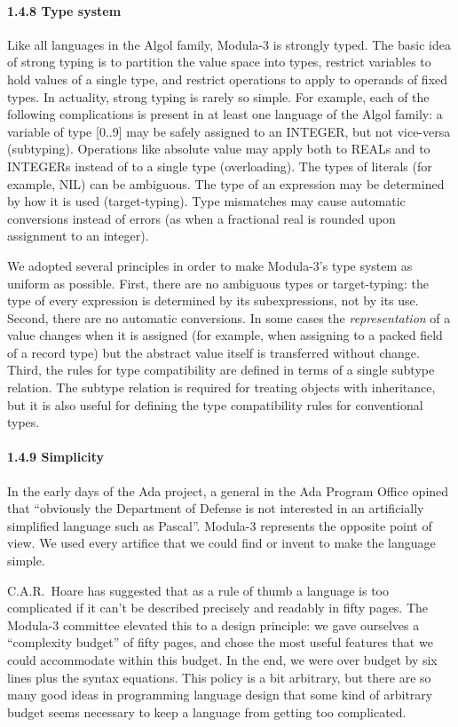 \documentclass[10pt]{article}
\begin{document}
\paragraph{1.4.8 Type system}

Like all languages in the Algol family, Modula-3 is strongly typed.  The basic
idea of strong typing is to partition the value space into types, restrict
variables to hold values of a single type, and restrict operations to apply to
operands of fixed types.  In actuality, strong typing is rarely so simple.  For
example, each of the following complications is present in at least one
language of the Algol family: a variable of type [0..9] may be safely assigned
to an INTEGER, but not vice-versa (subtyping).  Operations like absolute value
may apply both to REALs and to INTEGERs instead of to a single type
(overloading).  The types of literals (for example, NIL) can be ambiguous.  The
type of an expression may be determined by how it is used
(target-typing).  Type mismatches may cause automatic conversions instead of
errors (as when a fractional real is rounded upon assignment to an integer).

We adopted several principles in order to make Modula-3's type system as
uniform as possible.  First, there are no ambiguous types or target-typing: the
type of every expression is determined by its subexpressions, not by its
use.  Second, there are no automatic conversions.  In some cases the
\emph{representation} of a value changes when it is assigned (for example,
when assigning to a packed field of a record type) but the abstract value
itself is transferred without change.  Third, the rules for type compatibility
are defined in terms of a single subtype relation.  The subtype relation is
required for treating objects with inheritance, but it is also useful for
defining the type compatibility rules for conventional types.

\paragraph{1.4.9 Simplicity}

In the early days of the Ada project, a general in the Ada Program Office
opined that ``obviously the Department of Defense is not interested in an
artificially simplified language such as Pascal''.  Modula-3 represents the
opposite point of view.  We used every artifice that we could find or invent to
make the language simple.

C.A.R.\ Hoare has suggested that as a rule of thumb a language is too
complicated if it can't be described precisely and readably in fifty
pages.  The Modula-3 committee elevated this to a design principle: we gave
ourselves a ``complexity budget'' of fifty pages, and chose the most useful
features that we could accommodate within this budget.  In the end, we were
over budget by six lines plus the syntax equations.  This policy is a bit
arbitrary, but there are so many good ideas in programming language design
that some kind of arbitrary budget seems necessary to keep a language from
getting too complicated.
\end{document}
